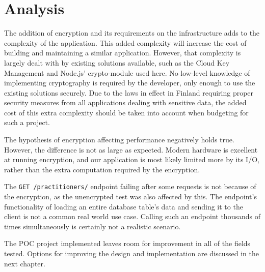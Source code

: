 \section{Analysis}

The addition of encryption and its requirements on the infrastructure adds to the complexity of the application.
This added complexity will increase the cost of building and maintaining a similar application.
However, that complexity is largely dealt with by existing solutions available, such as the Cloud Key Management and Node.js' crypto-module used here.
No low-level knowledge of implementing cryptography is required by the developer, only enough to use the existing solutions securely.
Due to the laws in effect in Finland requiring proper security measures from all applications dealing with sensitive data, the added cost of this extra complexity should be taken into account when budgeting for such a project.

The hypothesis of encryption affecting performance negatively holds true.
However, the difference is not as large as expected.
Modern hardware is excellent at running encryption, and our application is most likely limited more by its I/O, rather than the extra computation required by the encryption.

The \texttt{GET /practitioners/} endpoint failing after some requests is not because of the encryption, as the unencrypted test was also affected by this.
The endpoint's functionality of loading an entire database table's data and sending it to the client is not a common real world use case.
Calling such an endpoint thousands of times simultaneously is certainly not a realistic scenario.

The POC project implemented leaves room for improvement in all of the fields tested.
Options for improving the design and implementation are discussed in the next chapter.
